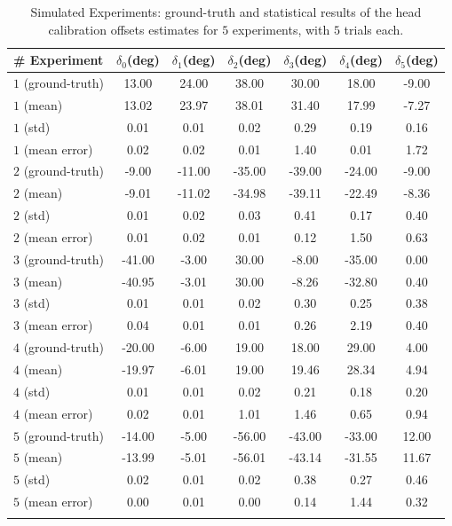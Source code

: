 \begin{table}
\centering
\begin{tabular}{lcccccc}
 \hline
 \# Experiment & $\delta_0$(deg) & $\delta_1$(deg) & $\delta_2$(deg) & $\delta_3$(deg) & $\delta_4$(deg) & $\delta_5$(deg) \\
 \hline
$1$ (ground-truth) & 13.00 & 24.00 & 38.00 & 30.00 & 18.00 & -9.00\\
$1$ (mean) & 13.02 & 23.97 & 38.01 & 31.40 & 17.99 & -7.27\\
$1$ (std) & 0.01 & 0.01 & 0.02 & 0.29 & 0.19 & 0.16 \\
$1$ (mean error) & 0.02 & 0.02 & 0.01 & 1.40 & 0.01 & 1.72\\
 \hline
$2$ (ground-truth) & -9.00 & -11.00 & -35.00 & -39.00 & -24.00 & -9.00\\
$2$ (mean) & -9.01 & -11.02 & -34.98 & -39.11 & -22.49 & -8.36\\
$2$ (std) & 0.01 & 0.02 & 0.03 & 0.41 & 0.17 & 0.40 \\
$2$ (mean error) & 0.01 & 0.02 & 0.01 & 0.12 & 1.50 & 0.63\\
 \hline
$3$ (ground-truth) & -41.00 & -3.00 & 30.00 & -8.00 & -35.00 & 0.00\\
$3$ (mean) & -40.95 & -3.01 & 30.00 & -8.26 & -32.80 & 0.40\\
$3$ (std) & 0.01 & 0.01 & 0.02 & 0.30 & 0.25 & 0.38 \\
$3$ (mean error) & 0.04 & 0.01 & 0.01 & 0.26 & 2.19 & 0.40\\
 \hline
$4$ (ground-truth) & -20.00 & -6.00 & 19.00 & 18.00 & 29.00 & 4.00\\
$4$ (mean) & -19.97 & -6.01 & 19.00 & 19.46 & 28.34 & 4.94\\
$4$ (std) & 0.01 & 0.01 & 0.02 & 0.21 & 0.18 & 0.20 \\
$4$ (mean error) & 0.02 & 0.01 & 1.01 & 1.46 & 0.65 & 0.94\\
 \hline
$5$ (ground-truth) & -14.00 & -5.00 & -56.00 & -43.00 & -33.00 & 12.00\\
$5$ (mean) & -13.99 & -5.01 & -56.01 & -43.14 & -31.55 & 11.67\\
$5$ (std) & 0.02 & 0.01 & 0.02 & 0.38 & 0.27 & 0.46\\
$5$ (mean error) & 0.00 & 0.01 & 0.00 & 0.14 & 1.44 & 0.32\\
 \hline\\
\end{tabular}
\caption{Simulated Experiments: ground-truth and statistical results of the head calibration offsets estimates for $5$ experiments, with $5$ trials each.}
\label{tab:head_offsets_convergence}
\end{table}

